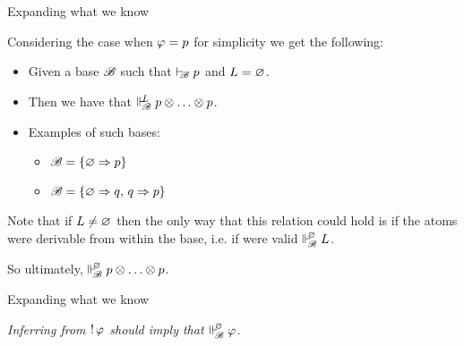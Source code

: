 \documentclass{beamer}
\begin{document}
\begin{frame}{Expanding what we know}
\begin{center}
Considering the case when $\varphi = {p}$ for simplicity we get the following:
\begin{itemize}
\pause
\item Given a base $\mathscr{B}$ such that $\vdash_{\!\!\mathscr{B}}{p}$ and $L=\varnothing$.
\pause
\item Then we have that $\Vdash_{ \!\!\mathscr{B} }^{ \!\!L }{p} \otimes \ldots \otimes {p}$.
\pause
\item Examples of such bases:
\begin{itemize}
	\item $\mathscr{B} = \{\varnothing \Rightarrow {p}\}$
	\item $\mathscr{B} = \{\varnothing \Rightarrow {q},\, {q}\Rightarrow {p} \}$
\end{itemize}
\pause
\end{itemize} 
\vspace{10pt}
Note that if $L \neq \varnothing$ then the only way that this relation could hold is if the atoms were derivable from within the base, i.e. if were valid $\Vdash_{ \!\!\mathscr{B} }^{ \!\!\varnothing }L$.

So ultimately, $\Vdash_{ \!\!\mathscr{B} }^{ \!\!\varnothing }p\otimes \ldots \otimes p$. 
\end{center}
\end{frame}
\begin{frame}{Expanding what we know}
\begin{center}
\noindent
\emph{Inferring from $\mathop{!} \varphi$ should imply that $\Vdash_{ \!\!\mathscr{B} }^{ \!\!\varnothing }\varphi$.}
\end{center}
\end{frame}
\end{document}

